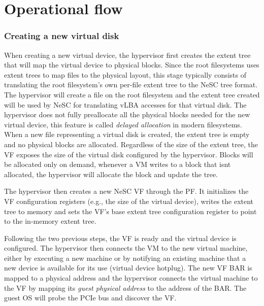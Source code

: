\section{Operational flow}

\subsubsection{Creating a new virtual disk}
When creating a new virtual device, the hypervisor first creates the extent tree that will map the virtual device to physical blocks. Since the root  filesystems uses extent trees to map files to the physical layout, this stage typically consists of translating the root filesystem's own per-file extent tree to the NeSC tree format. The hypervisor will create a file on the root filesystem and the extent tree created will be used by NeSC for translating vLBA accesses for that virtual disk.
%
The hypervisor does not fully preallocate all the physical blocks needed for the new virtual device, this feature is called \emph{delayed allocation} in modern filesystems. When a new file representing a virtual disk is created, the
extent tree is empty and no physical blocks are allocated. Regardless of the size of the extent tree, the VF exposes the size of the virtual disk configured by the hypervisor. Blocks will be allocated only on demand, whenever a VM writes to
a block that isnt allocated, the hypervisor will allocate the block and update the tree.

The hypervisor then creates a new NeSC VF through the PF. It initializes the VF configuration registers (e.g., the size of the virtual device), writes the extent tree to  memory and sets the VF's base extent tree configuration register to point to the in-memory extent tree.

Following the two previous steps, the VF is ready and the virtual device is configured. The hypervisor then connects the VM to the new virtual machine, either by executing a new machine or by notifying an existing machine that a new device is available for its use (virtual device hotplug).
The new VF BAR is mapped to a physical address and the hypervisor connects the virtual machine to the VF by mapping its \emph{guest physical address} to the address of the BAR.
The guest OS will probe the PCIe bus and discover the VF.


